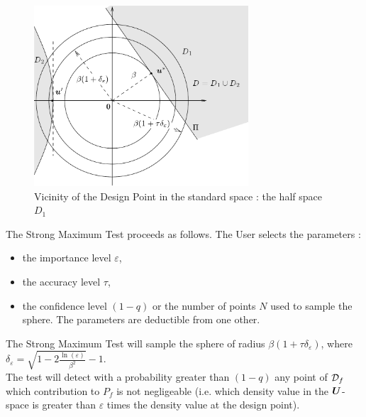 \begin{figure}[H]
  \begin{center}
    \includegraphics[width = 8cm]{Figures/StrongMaxTest_vicinity.png}
    \caption{Vicinity of the Design Point in the standard space : the half space $D_1$}
    \label{vicinity}
  \end{center}
\end{figure}

The Strong Maximum Test proceeds as follows. The User selects the parameters :
\begin{itemize}
\item the importance level $\varepsilon$,
\item the accuracy level $\tau$,
\item the confidence level $(1 - q)$ or the number of points $N$ used to sample the sphere. The parameters are deductible from one other.
\end{itemize}
The Strong Maximum Test will sample the sphere of radius  $\beta(1+\tau  \delta_{\varepsilon})$, where  $\delta_{\varepsilon} =        \sqrt{1 - 2 \frac{\ln(\varepsilon)}{\beta^2}}- 1$. \\
The test will detect with a probability greater than $(1 - q)$ any point of ${\mathcal D}_f$ which contribution to $P_f$ is not negligeable (i.e. which density value in the ${\boldsymbol{U}}$-space is greater than $\varepsilon$ times the density value  at the design point).\\

